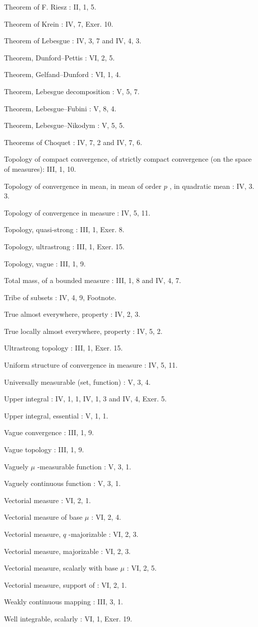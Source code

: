 Theorem of F. Riesz : II, 1, 5.

Theorem of Krein : IV, 7, Exer. 10.

Theorem of Lebesgue : IV, 3, 7 and IV, 4, 3.

Theorem, Dunford--Pettis : VI, 2, 5.

Theorem, Gelfand--Dunford : VI, 1, 4.

Theorem, Lebesgue decomposition : V, 5, 7.

Theorem, Lebesgue--Fubini : V, 8, 4.

Theorem, Lebesgue--Nikodym : V, 5, 5.

Theorems of Choquet : IV, 7, 2 and IV, 7, 6.

Topology of compact convergence, of strictly compact convergence (on the space of measures): III, 1, 10.

Topology of convergence in mean, in mean of order \(p\) , in quadratic mean : IV, 3. 3.

Topology of convergence in measure : IV, 5, 11.

Topology, quasi-strong : III, 1, Exer. 8.

Topology, ultrastrong : III, 1, Exer. 15.

Topology, vague : III, 1, 9.

Total mass, of a bounded measure : III, 1, 8 and IV, 4, 7.

Tribe of subsets : IV, 4, 9, Footnote.

True almost everywhere, property : IV, 2, 3.

True locally almost everywhere, property : IV, 5, 2.

Ultrastrong topology : III, 1, Exer. 15.

Uniform structure of convergence in measure : IV, 5, 11.

Universally measurable (set, function) : V, 3, 4.

Upper integral : IV, 1, 1, IV, 1, 3 and IV, 4, Exer. 5.

Upper integral, essential : V, 1, 1.

Vague convergence : III, 1, 9.

Vague topology : III, 1, 9.

Vaguely \(\mu\) -measurable function : V, 3, 1.

Vaguely continuous function : V, 3, 1.

Vectorial measure : VI, 2, 1.

Vectorial measure of base \(\mu\) : VI, 2, 4.

Vectorial measure, \(q\) -majorizable : VI, 2, 3.

Vectorial measure, majorizable : VI, 2, 3.

Vectorial measure, scalarly with base \(\mu\) : VI, 2, 5.

Vectorial measure, support of : VI, 2, 1.

Weakly continuous mapping : III, 3, 1.

Well integrable, scalarly : VI, 1, Exer. 19.

